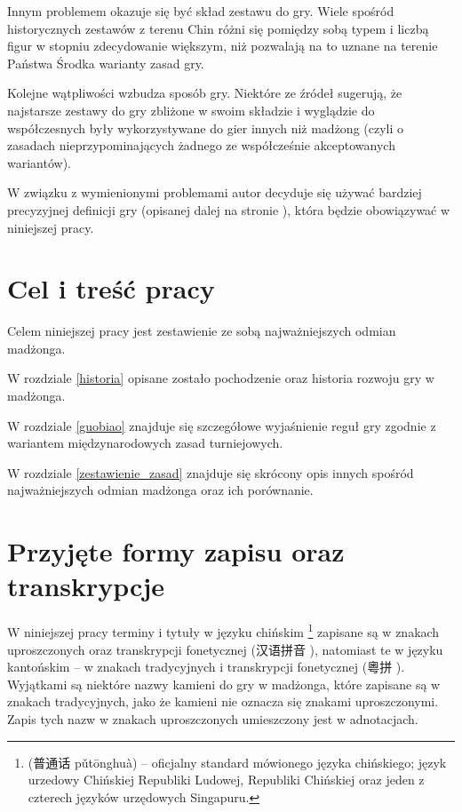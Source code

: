 Innym problemem okazuje się być skład zestawu do gry. Wiele spośród
historycznych zestawów z terenu Chin różni się pomiędzy sobą typem i liczbą
figur w stopniu zdecydowanie większym, niż pozwalają na to uznane na terenie
Państwa Środka warianty zasad gry.

Kolejne wątpliwości wzbudza sposób gry. Niektóre ze źródeł sugerują, że
najstarsze zestawy do gry zbliżone w swoim składzie i wyglądzie do współczesnych
były wykorzystywane do gier innych niż madżong (czyli o zasadach
nieprzypominających żadnego ze współcześnie akceptowanych wariantów).

W związku z wymienionymi problemami autor decyduje się używać bardziej
precyzyjnej definicji gry (opisanej dalej na stronie \pageref{definicja}), która
będzie obowiązywać w niniejszej pracy.
\section{Cel i treść pracy}
Celem niniejszej pracy jest zestawienie ze sobą najważniejszych odmian madżonga.

W rozdziale \ref{historia} opisane zostało pochodzenie oraz historia rozwoju gry
w madżonga.

W rozdziale \ref{guobiao} znajduje się szczegółowe wyjaśnienie reguł gry zgodnie
z wariantem międzynarodowych zasad turniejowych.

W rozdziale \ref{zestawienie_zasad} znajduje się skrócony opis innych spośród
najważniejszych odmian madżonga oraz ich porównanie.
\section{Przyjęte formy zapisu oraz transkrypcje}
W niniejszej pracy terminy i tytuły w języku chińskim
\footnote{ (普通话 pǔtōnghuà) -- oficjalny
standard mówionego języka chińskiego; język urzedowy Chińskiej Republiki
Ludowej, Republiki Chińskiej oraz jeden z czterech języków urzędowych
Singapuru.} zapisane są w znakach uproszczonych oraz transkrypcji fonetycznej
 (汉语拼音 ), natomiast te w języku
kantońskim -- w znakach tradycyjnych i transkrypcji fonetycznej
 (粵拼 ). Wyjątkami są niektóre nazwy
kamieni do gry w madżonga, które zapisane są w znakach tradycyjnych, jako że
kamieni nie oznacza się znakami uproszczonymi. Zapis tych nazw w znakach
uproszczonych umieszczony jest w adnotacjach.

